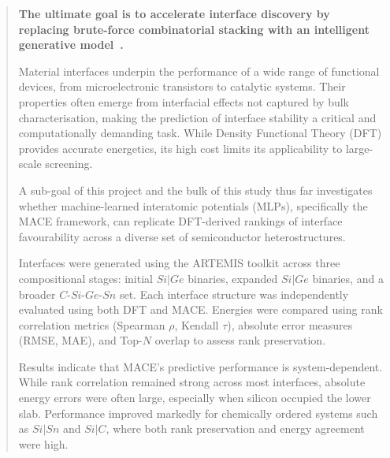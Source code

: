 \begin{abstract}
    \textbf{The ultimate goal is to accelerate interface discovery by replacing brute-force combinatorial stacking with an intelligent generative model~\nocite{}.}

    Material interfaces underpin the performance of a wide range of functional devices, from microelectronic transistors to catalytic systems. Their properties often emerge from interfacial effects not captured by bulk characterisation, making the prediction of interface stability a critical and computationally demanding task. While Density Functional Theory (DFT) provides accurate energetics, its high cost limits its applicability to large-scale screening.

    A sub-goal of this project and the bulk of this study thus far investigates whether machine-learned interatomic potentials (MLPs), specifically the MACE framework, can replicate DFT-derived rankings of interface favourability across a diverse set of semiconductor heterostructures.

    Interfaces were generated using the ARTEMIS toolkit across three compositional stages: initial $Si|Ge$ binaries, expanded $Si|Ge$ binaries, and a broader $C$-$Si$-$Ge$-$Sn$ set. Each interface structure was independently evaluated using both DFT and MACE. Energies were compared using rank correlation metrics (Spearman $\rho$, Kendall $\tau$), absolute error measures (RMSE, MAE), and Top-$N$ overlap to assess rank preservation.

    Results indicate that MACE's predictive performance is system-dependent. While rank correlation remained strong across most interfaces, absolute energy errors were often large, especially when silicon occupied the lower slab. Performance improved markedly for chemically ordered systems such as $Si|Sn$ and $Si|C$, where both rank preservation and energy agreement were high.
\end{abstract}
